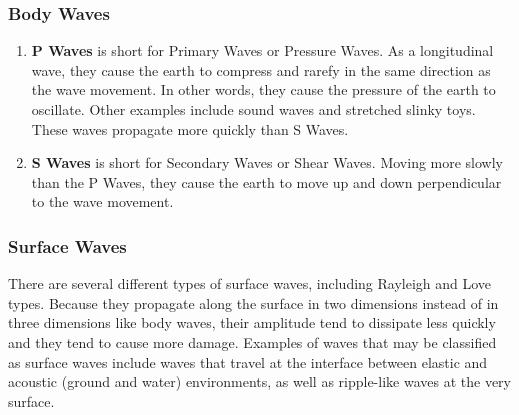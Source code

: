 \subsubsection{Body Waves}

\begin{enumerate}[leftmargin=0.5in]
	\item{\textbf{P Waves}} is short for Primary Waves or Pressure Waves. As a longitudinal wave, they cause the earth to compress and rarefy in the same direction as the wave movement. In other words, they cause the pressure of the earth to oscillate. Other examples include sound waves and stretched slinky toys. These waves propagate more quickly than S Waves.
	
	\item{\textbf{S Waves}} is short for Secondary Waves or Shear Waves. Moving more slowly than the P Waves, they cause the earth to move up and down perpendicular to the wave movement.
\end{enumerate}


\subsubsection{Surface Waves}

There are several different types of surface waves, including Rayleigh and Love types. Because they propagate along the surface in two dimensions instead of in three dimensions like body waves, their amplitude tend to dissipate less quickly and they tend to cause more damage. Examples of waves that may be classified as surface waves include waves that travel at the interface between elastic and acoustic (ground and water) environments, as well as ripple-like waves at the very surface.

























